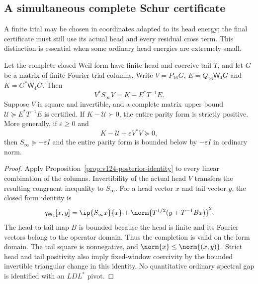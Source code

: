 \subsection*{A simultaneous complete Schur certificate}

A finite trial may be chosen in coordinates adapted to its head energy;
the final certificate must still use its actual head and every residual
cross term.  This distinction is essential when some ordinary head
energies are extremely small.

\begin{proposition}
\label{prop:v125-simultaneous}
Let the complete closed Weil form have finite head and coercive tail
$T$, and let $G$ be a matrix of finite Fourier trial columns.  Write
$V=P_{16}G$, $E=Q_{16}\mathsf W_4G$ and $K=G^*\mathsf W_4G$.
Then
\begin{equation}\label{eq:v125-simultaneous}
 V^*S_\infty V=K-E^*T^{-1}E.
\end{equation}
Suppose $V$ is square and invertible, and a complete matrix upper bound
$\mathcal U\succeq E^*T^{-1}E$ is certified.  If
$K-\mathcal U\succ0$, the entire parity form is strictly positive.
More generally, if $\varepsilon\ge0$ and
\[
 K-\mathcal U+\varepsilon V^*V\succeq0,
\]
then $S_\infty\succeq-\varepsilon I$ and the entire parity form is
bounded below by $-\varepsilon I$ in ordinary norm.
\end{proposition}
\begin{proof}
Apply Proposition~\ref{prop:v124-posterior-identity} to every linear
combination of the columns.  Invertibility of the actual head $V$
transfers the resulting congruent inequality to $S_\infty$.
For a head vector $x$ and tail vector $y$, the closed form identity is
\[
 q_{\mathsf W_4}[x,y]
 =\ip{S_\infty x}{x}
   +\norm{T^{1/2}(y+T^{-1}Bx)}^2.
\]
The head-to-tail map $B$ is bounded because the head is finite
and its Fourier vectors belong to the operator domain.  Thus the
completion is valid on the form domain.  The tail square is
nonnegative, and $\norm{x}\le\norm{(x,y)}$.  Strict head and tail
positivity also imply fixed-window coercivity by the bounded
invertible triangular change in this identity.  No quantitative
ordinary spectral gap is identified with an $LDL^*$ pivot.
\end{proof}

